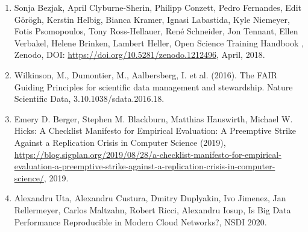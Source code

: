 \begin{enumerate}
    \item Sonja Bezjak, April Clyburne-Sherin, Philipp Conzett, Pedro Fernandes, Edit Görögh, Kerstin Helbig, Bianca Kramer, Ignasi Labastida, Kyle Niemeyer, Fotis Psomopoulos, Tony Ross-Hellauer, René Schneider, Jon Tennant, Ellen Verbakel, Helene Brinken, Lambert Heller, Open Science Training Handbook , Zenodo, DOI: \url{https://doi.org/10.5281/zenodo.1212496}, April, 2018.
    \item Wilkinson, M., Dumontier, M., Aalbersberg, I. et al. (2016). The FAIR Guiding Principles for scientific data management and stewardship. Nature Scientific Data, 3.10.1038/sdata.2016.18. 
    \item Emery D. Berger, Stephen M. Blackburn, Matthias Hauswirth, Michael W. Hicks: A Checklist Manifesto for Empirical Evaluation: A Preemptive Strike Against a Replication Crisis in Computer Science (2019),  \url{https://blog.sigplan.org/2019/08/28/a-checklist-manifesto-for-empirical-evaluation-a-preemptive-strike-against-a-replication-crisis-in-computer-science/}, 2019. 
    \item Alexandru Uta, Alexandru Custura, Dmitry Duplyakin, Ivo Jimenez, Jan Rellermeyer, Carlos Maltzahn, Robert Ricci, Alexandru Iosup, Is Big Data Performance Reproducible in Modern Cloud Networks?, NSDI 2020. 
\end{enumerate}


